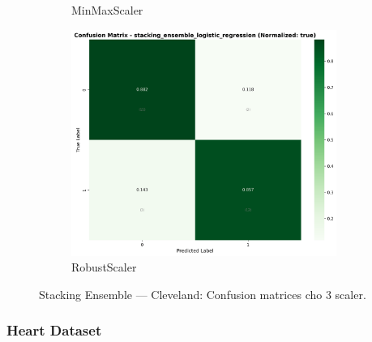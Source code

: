 \begin{figure}[H]
\begin{subfigure}[b]{0.31\textwidth}
\caption{MinMaxScaler}\label{fig:stacking_clev_cm_minmax}
\end{subfigure}\hfill
\begin{subfigure}[b]{0.31\textwidth}\centering
\includegraphics[width=0.95\textwidth]{Result/cleveland_dataset/confusion_matrices/stacking_ensemble_logistic_regression_numeric_dataset_RobustScaler.png}
\caption{RobustScaler}\label{fig:stacking_clev_cm_robust}
\end{subfigure}
\caption{Stacking Ensemble — Cleveland: Confusion matrices cho 3 scaler.}
\label{fig:stacking_clev_confusions}
\end{figure}

\FloatBarrier

\subsubsection{Heart Dataset}\label{subsubsec:stacking-heart}

